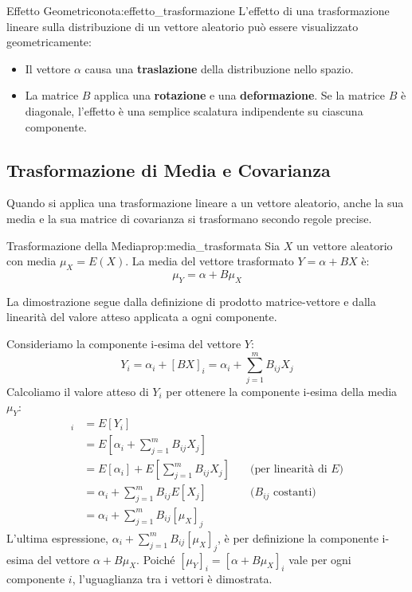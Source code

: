 \begin{nota}{Effetto Geometrico}{nota:effetto_trasformazione}
L'effetto di una trasformazione lineare sulla distribuzione di un vettore aleatorio può essere visualizzato geometricamente:
\begin{itemize}
    \item Il vettore \(\alpha\) causa una \textbf{traslazione} della distribuzione nello spazio.
    \item La matrice \(B\) applica una \textbf{rotazione} e una \textbf{deformazione}. Se la matrice \(B\) è diagonale, l'effetto è una semplice scalatura indipendente su ciascuna componente.
\end{itemize}
\end{nota}

\subsection{Trasformazione di Media e Covarianza}
Quando si applica una trasformazione lineare a un vettore aleatorio, anche la sua media e la sua matrice di covarianza si trasformano secondo regole precise.

\begin{proposizione}{Trasformazione della Media}{prop:media_trasformata}
Sia \(X\) un vettore aleatorio con media \(\mu_X = E(X)\). La media del vettore trasformato \(Y = \alpha + BX\) è:
\[
\mu_Y = \alpha + B\mu_X
\]
\end{proposizione}
\begin{dimostrazione}{}{}
La dimostrazione segue dalla definizione di prodotto matrice-vettore e dalla linearità del valore atteso applicata a ogni componente.

Consideriamo la componente i-esima del vettore \(Y\):
\[
Y_i = \alpha_i + [BX]_i = \alpha_i + \sum_{j=1}^m B_{ij} X_j
\]
Calcoliamo il valore atteso di \(Y_i\) per ottenere la componente i-esima della media \(\mu_Y\):
\begin{align*}
    [\mu_Y]_i &= E[Y_i] \\
    &= E\left[ \alpha_i + \sum_{j=1}^m B_{ij} X_j \right] \\
    &= E[\alpha_i] + E\left[ \sum_{j=1}^m B_{ij} X_j \right] &\quad \text{(per linearità di $E$)} \\
    &= \alpha_i + \sum_{j=1}^m B_{ij} E[X_j] &\quad \text{($B_{ij}$ costanti)} \\
    &= \alpha_i + \sum_{j=1}^m B_{ij} [\mu_X]_j
\end{align*}
L'ultima espressione, \( \alpha_i + \sum_{j=1}^m B_{ij} [\mu_X]_j \), è per definizione la componente i-esima del vettore \( \alpha + B\mu_X \).
Poiché \( [\mu_Y]_i = [\alpha + B\mu_X]_i \) vale per ogni componente \(i\), l'uguaglianza tra i vettori è dimostrata.
\end{dimostrazione}


